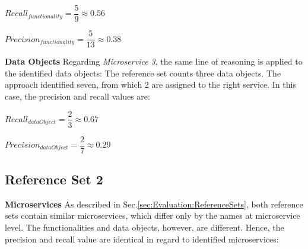 \hspace{1cm}
\noindent
\begin{minipage}{.4\linewidth}
	\vspace{0.5cm}
	\flushleft
	
	
	$Recall_{functionality}=\dfrac{5}{9} \approx 0.56  $
	\vspace{0.5cm}
	
\end{minipage}%
\begin{minipage}{.5\linewidth}
	\vspace{0.5cm}
	\flushleft
	
	
	$Precision_{functionality}=\dfrac{5}{13} \approx 0.38  $
	\vspace{0.5cm}
	
\end{minipage}


\noindent
\textbf{Data Objects} Regarding \textit{Microservice 3}, the same line of reasoning is applied to the identified data objects: The reference set counts three data objects. The approach identified seven, from which 2 are assigned to the right service. In this case, the precision and recall values are:


\hspace{1cm}
\noindent
\begin{minipage}{.4\linewidth}
	\vspace{0.5cm}
	\flushleft
	
	
	$Recall_{dataObject}=\dfrac{2}{3} \approx 0.67  $
	\vspace{0.5cm}
	
\end{minipage}%
\begin{minipage}{.5\linewidth}
	\vspace{0.5cm}
	\flushleft
	
	
	$Precision_{dataObject}=\dfrac{2}{7} \approx 0.29  $
	\vspace{0.5cm}
	
\end{minipage}





\subsection{Reference Set 2}



\textbf{Microservices} As described in Sec.\ref{sec:Evaluation:ReferenceSets}, both reference sets contain similar microservices, which differ only by the names at microservice level. The functionalities and data objects, however, are different. Hence, the precision and recall value are identical in regard to identified microservices:

